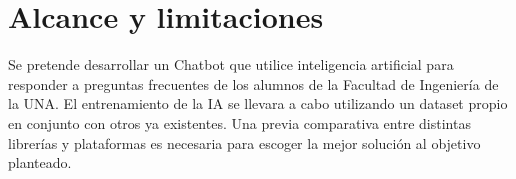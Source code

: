\section{Alcance y limitaciones}
Se pretende desarrollar un Chatbot que utilice inteligencia artificial para responder a preguntas frecuentes de los alumnos de la Facultad de Ingeniería de la UNA. El entrenamiento de la IA se llevara a cabo utilizando un dataset propio en conjunto con otros ya existentes.
Una previa comparativa entre distintas librerías y plataformas es necesaria para escoger la mejor solución al objetivo planteado. 
